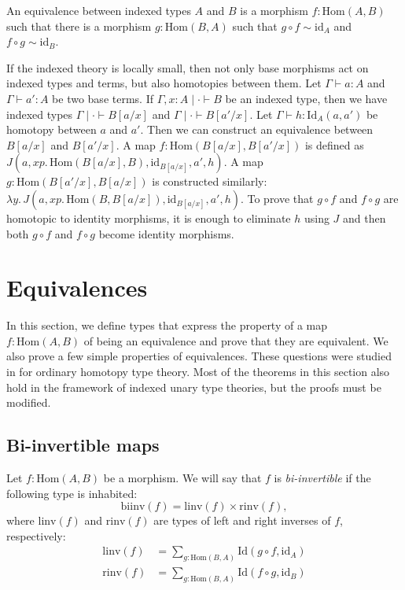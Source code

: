\documentclass[reqno]{amsart}
\theoremstyle{definition}
\theoremstyle{remark}
\newcommand{\ob}{}
\newcommand{\fs}[1]{\mathrm{#1}}
\newcommand{\Hom}{\fs{Hom}}
\newcommand{\Id}{\fs{Id}}
\newcommand{\id}{\fs{id}}
\numberwithin{figure}{section}
\begin{document}
\begin{defn}
An equivalence between indexed types $A$ and $B$ is a morphism $f : \Hom(A,B)$ such that there is a morphism $g : \Hom(B,A)$ such that $g \circ f \sim \id_A$ and $f \circ g \sim \id_B$.
\end{defn}

If the indexed theory is locally small, then not only base morphisms act on indexed types and terms, but also homotopies between them.
Let $\Gamma \vdash a : A$ and $\Gamma \vdash a' : A$ be two base terms.
If $\Gamma, x : A \mid \cdot \vdash B \ob$ be an indexed type, then we have indexed types $\Gamma \mid \cdot \vdash B[a/x] \ob$ and $\Gamma \mid \cdot \vdash B[a'/x] \ob$.
Let $\Gamma \vdash h : \Id_A(a,a')$ be homotopy between $a$ and $a'$.
Then we can construct an equivalence between $B[a/x]$ and $B[a'/x]$.
A map $f : \Hom(B[a/x],B[a'/x])$ is defined as $J(a, x p.\,\Hom(B[a/x],B), \id_{B[a/x]}, a', h)$.
A map $g : \Hom(B[a'/x],B[a/x])$ is constructed similarly: $\lambda y.\,J(a, x p.\,\Hom(B,B[a/x]), \id_{B[a/x]}, a', h)$.
To prove that $g \circ f$ and $f \circ g$ are homotopic to identity morphisms, it is enough to eliminate $h$ using $J$ and then both $g \circ f$ and $f \circ g$ become identity morphisms.

\section{Equivalences}
\label{sec:equivalence}

In this section, we define types that express the property of a map $f : \Hom(A,B)$ of being an equivalence and prove that they are equivalent.
We also prove a few simple properties of equivalences.
These questions were studied in \cite[Section~4]{hottbook} for ordinary homotopy type theory.
Most of the theorems in this section also hold in the framework of indexed unary type theories, but the proofs must be modified.

\subsection{Bi-invertible maps}

Let $f : \Hom(A,B)$ be a morphism.
We will say that $f$ is \emph{bi-invertible} if the following type is inhabited:
\[ \fs{biinv}(f) = \fs{linv}(f) \times \fs{rinv}(f), \]
where $\fs{linv}(f)$ and $\fs{rinv}(f)$ are types of left and right inverses of $f$, respectively:
\begin{align*}
\fs{linv}(f) & = \sum_{g : \Hom(B,A)} \Id(g \circ f, \id_A) \\
\fs{rinv}(f) & = \sum_{g : \Hom(B,A)} \Id(f \circ g, \id_B)
\end{align*}
\end{document}
